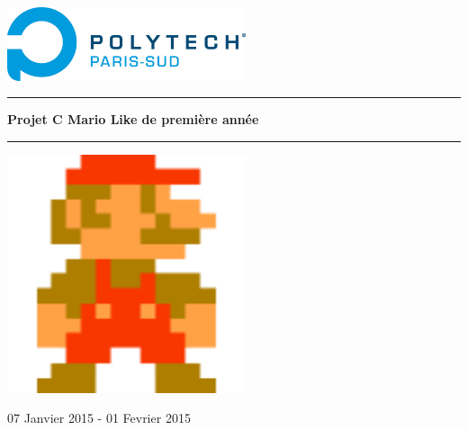 \begin{titlepage}
~\\[1cm]
\begin{center}
 \includegraphics[width=7cm]{logoPolytech.jpg}~\\[1.5cm]
 \end{center}
 \hrule
	\begin{center}
	{ \huge \bfseries Projet C Mario Like de première année\\[0.4cm] }
	\hrule
	\end{center}
	\begin{center}
 \includegraphics[width=7cm]{marioIcon.png}~\\[1.5cm]
 \end{center}
\vfill
\begin{center}
	07 Janvier 2015 - 01 Fevrier 2015
\end{center}
\end{titlepage}
